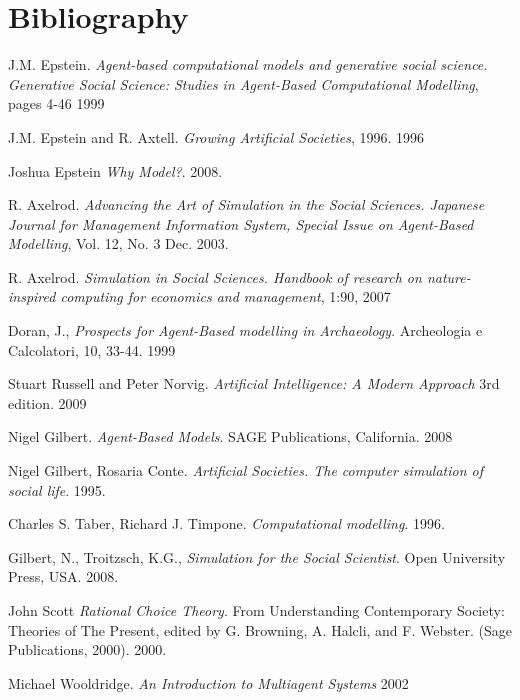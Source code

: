 \documentclass[11pt,oneside,a4paper,openright]{report}
\begin{document}
\chapter{Bibliography}
\begin{thebibliography}{49}

	J.M. Epstein. 
	\emph{Agent-based computational models and generative social science. Generative Social
	Science: Studies in Agent-Based Computational Modelling}, pages 4-46
	1999

	J.M. Epstein and R. Axtell.
	\emph{Growing Artificial Societies}, 1996.
	1996

	Joshua Epstein
	\emph{Why Model?}.
	2008.

	R. Axelrod. 
	\emph{Advancing the Art of Simulation in the Social Sciences. Japanese Journal for Management Information System, Special Issue on Agent-Based Modelling}, Vol. 12, No. 3 
	Dec. 2003. 

	R. Axelrod. 
	\emph{Simulation in Social Sciences. Handbook of research on nature-inspired computing for economics and management}, 1:90, 
	2007

	Doran, J., 
	\emph{Prospects for Agent-Based modelling in Archaeology}. Archeologia e Calcolatori, 10, 33-44.
	1999

	Stuart Russell and Peter Norvig.
	\emph{Artificial Intelligence: A Modern Approach} 3rd edition.
	2009

	Nigel Gilbert.
	\emph{Agent-Based Models}. SAGE Publications, California.
	2008

	Nigel Gilbert, Rosaria Conte.
	\emph{Artificial Societies. The computer simulation of social life}.
	1995.

	Charles S. Taber, Richard J. Timpone.
	\emph{Computational modelling}.
	1996.

	Gilbert, N., Troitzsch, K.G.,
	\emph{Simulation for the Social Scientist}. Open University Press, USA.
	2008.

	John Scott
	\emph{Rational Choice Theory}. From Understanding Contemporary Society: Theories of The Present, edited by G. Browning,
	A. Halcli, and F. Webster. (Sage Publications, 2000).
	2000.

	Michael Wooldridge.
	\emph{An Introduction to Multiagent Systems}
	2002


\end{thebibliography}
\end{document}
